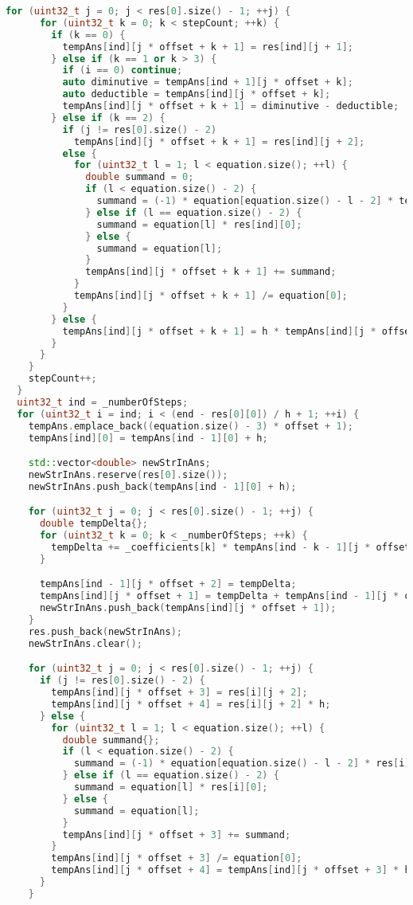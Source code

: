 \documentclass{report}
\begin{document}
\begin{lstlisting}[language=C++,caption=Последовательная версия]
    for (uint32_t j = 0; j < res[0].size() - 1; ++j) {
      for (uint32_t k = 0; k < stepCount; ++k) {
        if (k == 0) {
          tempAns[ind][j * offset + k + 1] = res[ind][j + 1];
        } else if (k == 1 or k > 3) {
          if (i == 0) continue;
          auto diminutive = tempAns[ind + 1][j * offset + k];
          auto deductible = tempAns[ind][j * offset + k];
          tempAns[ind][j * offset + k + 1] = diminutive - deductible;
        } else if (k == 2) {
          if (j != res[0].size() - 2)
            tempAns[ind][j * offset + k + 1] = res[ind][j + 2];
          else {
            for (uint32_t l = 1; l < equation.size(); ++l) {
              double summand = 0;
              if (l < equation.size() - 2) {
                summand = (-1) * equation[equation.size() - l - 2] * tempAns[ind][(l - 1) * offset + k - 1];
              } else if (l == equation.size() - 2) {
                summand = equation[l] * res[ind][0];
              } else {
                summand = equation[l];
              }
              tempAns[ind][j * offset + k + 1] += summand;
            }
            tempAns[ind][j * offset + k + 1] /= equation[0];
          }
        } else {
          tempAns[ind][j * offset + k + 1] = h * tempAns[ind][j * offset + k];
        }
      }
    }
    stepCount++;
  }
  uint32_t ind = _numberOfSteps;
  for (uint32_t i = ind; i < (end - res[0][0]) / h + 1; ++i) {
    tempAns.emplace_back((equation.size() - 3) * offset + 1);
    tempAns[ind][0] = tempAns[ind - 1][0] + h;

    std::vector<double> newStrInAns;
    newStrInAns.reserve(res[0].size());
    newStrInAns.push_back(tempAns[ind - 1][0] + h);

    for (uint32_t j = 0; j < res[0].size() - 1; ++j) {
      double tempDelta{};
      for (uint32_t k = 0; k < _numberOfSteps; ++k) {
        tempDelta += _coefficients[k] * tempAns[ind - k - 1][j * offset + 4 + k];
      }

      tempAns[ind - 1][j * offset + 2] = tempDelta;
      tempAns[ind][j * offset + 1] = tempDelta + tempAns[ind - 1][j * offset + 1];
      newStrInAns.push_back(tempAns[ind][j * offset + 1]);
    }
    res.push_back(newStrInAns);
    newStrInAns.clear();

    for (uint32_t j = 0; j < res[0].size() - 1; ++j) {
      if (j != res[0].size() - 2) {
        tempAns[ind][j * offset + 3] = res[i][j + 2];
        tempAns[ind][j * offset + 4] = res[i][j + 2] * h;
      } else {
        for (uint32_t l = 1; l < equation.size(); ++l) {
          double summand{};
          if (l < equation.size() - 2) {
            summand = (-1) * equation[equation.size() - l - 2] * res[i][l];
          } else if (l == equation.size() - 2) {
            summand = equation[l] * res[i][0];
          } else {
            summand = equation[l];
          }
          tempAns[ind][j * offset + 3] += summand;
        }
        tempAns[ind][j * offset + 3] /= equation[0];
        tempAns[ind][j * offset + 4] = tempAns[ind][j * offset + 3] * h;
      }
    }


\end{lstlisting}
\end{document}
